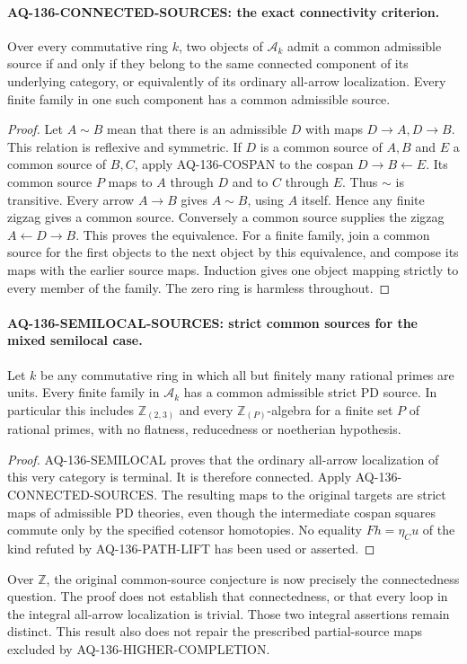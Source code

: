 \paragraph{AQ-136-CONNECTED-SOURCES: the exact connectivity criterion.}
Over every commutative ring $k$, two objects of $\mathcal A_k$
admit a common admissible source if and only if they belong
to the same connected component of its underlying category,
or equivalently of its ordinary all-arrow localization.
Every finite family in one such component has a common
admissible source.

\begin{proof}
Let $A\sim B$ mean that there is an admissible $D$ with
maps $D\to A,D\to B$. This relation is reflexive and
symmetric. If $D$ is a common source of $A,B$ and $E$ a
common source of $B,C$, apply AQ-136-COSPAN to the cospan
$D\to B\leftarrow E$. Its common source $P$ maps to
$A$ through $D$ and to $C$ through $E$. Thus $\sim$ is
transitive. Every arrow $A\to B$ gives $A\sim B$, using
$A$ itself. Hence any finite zigzag gives a common source.
Conversely a common source supplies the zigzag
$A\leftarrow D\to B$. This proves the equivalence.
For a finite family, join a common source for the first
objects to the next object by this equivalence, and compose
its maps with the earlier source maps. Induction gives
one object mapping strictly to every member of the family.
The zero ring is harmless throughout.
\end{proof}

\paragraph{AQ-136-SEMILOCAL-SOURCES: strict common sources for the mixed semilocal case.}
Let $k$ be any commutative ring in which all but finitely
many rational primes are units. Every finite family in
$\mathcal A_k$ has a common admissible strict PD source.
In particular this includes $\mathbb Z_{(2,3)}$ and
every $\mathbb Z_{(P)}$-algebra for a finite set $P$ of
rational primes, with no flatness, reducedness or noetherian
hypothesis.

\begin{proof}
AQ-136-SEMILOCAL proves that the ordinary all-arrow
localization of this very category is terminal. It is
therefore connected. Apply AQ-136-CONNECTED-SOURCES.
The resulting maps to the original targets are strict
maps of admissible PD theories, even though the intermediate
cospan squares commute only by the specified cotensor
homotopies. No equality $Fh=\eta_Cu$ of the kind refuted
by AQ-136-PATH-LIFT has been used or asserted.
\end{proof}

Over $\mathbb Z$, the original common-source conjecture is
now precisely the connectedness question. The proof does
not establish that connectedness, or that every loop in
the integral all-arrow localization is trivial. Those two
integral assertions remain distinct. This result also does
not repair the prescribed partial-source maps excluded by
AQ-136-HIGHER-COMPLETION.
